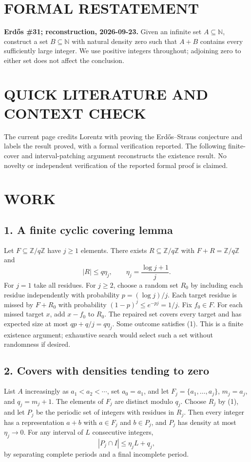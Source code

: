 \section{FORMAL RESTATEMENT}
\textbf{Erd\H{o}s \#31; reconstruction, 2026-09-23.}
Given an infinite set $A\subseteq\mathbb N$, construct a set
$B\subseteq\mathbb N$ with natural density zero such that $A+B$
contains every sufficiently large integer. We use positive integers
throughout; adjoining zero to either set does not affect the conclusion.

\section{QUICK LITERATURE AND CONTEXT CHECK}
The current page credits Lorentz with proving the Erd\H{o}s--Straus
conjecture and labels the result proved, with a formal verification
reported. The following finite-cover and interval-patching argument
reconstructs the existence result. No novelty or independent verification
of the reported formal proof is claimed.

\section{WORK}
\subsection{1. A finite cyclic covering lemma}
Let $F\subseteq\mathbb Z/q\mathbb Z$ have $j\geq1$ elements. There
exists $R\subseteq\mathbb Z/q\mathbb Z$ with $F+R=\mathbb Z/q\mathbb Z$
and
\[
 |R|\leq q\eta_j,\qquad \eta_j=\frac{\log j+1}{j}.    \tag{1}
\]
For $j=1$ take all residues. For $j\geq2$, choose a random set $R_0$
by including each residue independently with probability $p=(\log j)/j$.
Each target residue is missed by $F+R_0$ with probability
$(1-p)^j\leq e^{-pj}=1/j$. Fix $f_0\in F$. For each missed target $x$,
add $x-f_0$ to $R_0$. The repaired set covers every target and has
expected size at most $qp+q/j=q\eta_j$. Some outcome satisfies (1).
This is a finite existence argument; exhaustive search would select
such a set without randomness if desired.

\subsection{2. Covers with densities tending to zero}
List $A$ increasingly as $a_1<a_2<\cdots$, set $a_0=a_1$, and let
$F_j=\{a_1,\ldots,a_j\}$, $m_j=a_j$, and $q_j=m_j+1$.
The elements of $F_j$ are distinct modulo $q_j$. Choose $R_j$ by (1),
and let $P_j$ be the periodic set of integers with residues in $R_j$.
Then every integer has a representation $a+b$ with $a\in F_j$ and
$b\in P_j$, and $P_j$ has density at most $\eta_j\to0$.
For any interval of $L$ consecutive integers,
\[
 |P_j\cap I|\leq\eta_j L+q_j,                         \tag{2}
\]
by separating complete periods and a final incomplete period.

